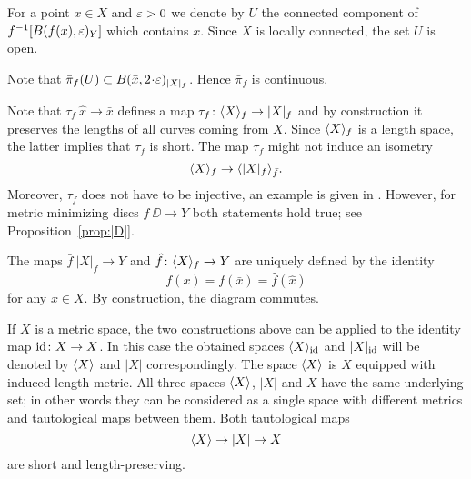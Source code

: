 \documentclass{article}
\begin{document}
For a point $x\in X$ and $\varepsilon>0$ we denote by $U$ the connected component of $f^{-1}[B(f(x),\varepsilon)_{Y}]$ which contains $x$.
Since $X$ is locally connected, the set $U$ is open.

Note that $\bar\pi_f(U)\subset B(\bar x,2\cdot \eps)_{|X|_f}$. Hence
$\bar\pi_f$ is continuous.
\qeds



\begin{wrapfigure}{r}{37 mm}
\end{wrapfigure}

Note that $\tau_f\: \hat x\to \bar x$ defines a map $\tau_f\: \<X\>_f\zz\to |X|_f$ and by construction it preserves the lengths of
all curves coming from $X$.
Since $\langle X\rangle_f$ is a length space, the latter implies that $\tau_f$ is short.
The map $\tau_f$ might not induce an isometry
\[\langle X\rangle_f\to\langle|X|_f\rangle_{\bar f}.\]
Moreover, $\tau_f$ does not have to be injective, an example is given in \cite[4.2]{petrunin-intrinisic}.
However, for metric minimizing discs $f\:\DD\to Y$ both statements hold true; see
Proposition~\ref{prop:|D|}.

The maps $\bar f\:|X|_f\to Y$ and $ \hat f\colon\langle X\rangle_f\to Y$ are uniquely defined by the identity
\[f(x)=\bar f(\bar x)=  \hat f( \hat x)\] for any $x\in X$.
By construction, the diagram commutes.

If $X$ is a metric space, the two constructions above can be applied to the identity map $\mathrm{id}\colon X\to X$.
In this case the obtained spaces $\langle X\rangle_{\mathrm{id}}$ and $|X|_{\mathrm{id}}$ will be denoted by $\langle X\rangle$ and $|X|$ correspondingly.
The space $\langle X\rangle$ is $X$ equipped with induced length metric.
All three spaces $\langle X\rangle$, $|X|$ and $X$ have the same underlying set;
in other words they can be considered as a single space with different metrics and tautological maps between them.
Both tautological maps 
\[\langle X\rangle\to |X|\to X\]
are short and length-preserving.
\end{document}
